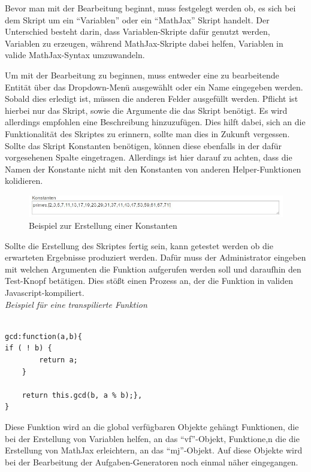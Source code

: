 Bevor man mit der Bearbeitung beginnt, muss festgelegt werden ob, es sich bei dem Skript um ein ``Variablen'' oder ein ``MathJax'' Skript handelt. Der Unterschied besteht darin, dass Variablen-Skripte dafür genutzt werden, Variablen zu erzeugen, während MathJax-Skripte dabei helfen, Variablen in valide MathJax-Syntax umzuwandeln.

Um mit der Bearbeitung zu beginnen, muss entweder eine zu bearbeitende Entität über das Dropdown-Menü ausgewählt oder ein Name eingegeben werden. Sobald dies erledigt ist, müssen die anderen Felder ausgefüllt werden. Pflicht ist hierbei nur das Skript, sowie die Argumente die das Skript benötigt. Es wird allerdings empfohlen eine Beschreibung hinzuzufügen. Dies hilft dabei, sich an die Funktionalität des Skriptes zu erinnern, sollte man dies in Zukunft vergessen. \\

Sollte das Skript Konstanten benötigen, können diese ebenfalls in der dafür vorgesehenen Spalte eingetragen. Allerdings ist hier darauf zu achten, dass die Namen der Konstante nicht mit den Konstanten von anderen Helper-Funktionen kolidieren.

\begin{figure}[htp]     %
\centering
\includegraphics[width=1\textwidth]{bilder/ConstantExample} 
\caption[Beispiel zur Erstellung einer Konstanten]{Beispiel zur Erstellung einer Konstanten}
\end{figure} 

Sollte die Erstellung des Skriptes fertig sein, kann getestet werden ob die erwarteten Ergebnisse produziert werden. Dafür muss der Administrator eingeben mit welchen Argumenten die Funktion aufgerufen werden soll und daraufhin den Test-Knopf betätigen. Dies stößt einen Prozess an, der die Funktion in validen Javascript-kompiliert. \\

\emph{Beispiel für eine transpilierte Funktion}
\begin{lstlisting}

gcd:function(a,b){
if ( ! b) {
        return a;
    }

    return this.gcd(b, a % b);}, 
}
\end{lstlisting}

Diese Funktion wird an die global verfügbaren Objekte gehängt Funktionen, die bei der Erstellung von Variablen helfen, an das ``vf''-Objekt, Funktione,n die die Erstellung von MathJax erleichtern, an das ``mj''-Objekt. Auf diese Objekte wird bei der Bearbeitung der Aufgaben-Generatoren noch einmal näher eingegangen. \\

